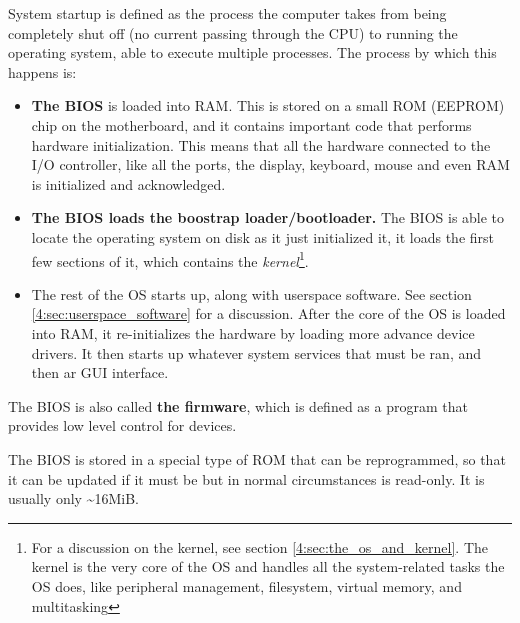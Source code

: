 \documentclass[../main.tex]{subfiles}
\begin{document}
System startup is defined as the process the computer takes from being completely shut off (no current passing through the CPU) to running the operating system, able to execute multiple processes. The process by which this happens is:

\begin{itemize}
    \item \textbf{The BIOS} is loaded into RAM. This is stored on a small ROM (EEPROM) chip on the motherboard, and it contains important code that performs hardware initialization. This means that all the hardware connected to the I/O controller, like all the ports, the display, keyboard, mouse and even RAM is initialized and acknowledged.
    \item \textbf{The BIOS loads the boostrap loader/bootloader.} The BIOS is able to locate the operating system on disk as it just initialized it, it loads the first few sections of it, which contains the \emph{kernel}\footnote{For a discussion on the kernel, see section \ref{4:sec:the_os_and_kernel}. The kernel is the very core of the OS and handles all the system-related tasks the OS does, like peripheral management, filesystem, virtual memory, and multitasking}.
    \item The rest of the OS starts up, along with userspace software. See section \ref{4:sec:userspace_software} for a discussion. After the core of the OS is loaded into RAM, it re-initializes the hardware by loading more advance device drivers. It then starts up whatever system services that must be ran, and then ar GUI interface.
\end{itemize}

The BIOS is also called \textbf{the firmware}, which is defined as a program that provides low level control for devices.

The BIOS is stored in a special type of ROM that can be reprogrammed, so that it can be updated if it must be but in normal circumstances is read-only. It is usually only \textasciitilde16MiB.
\end{document}
